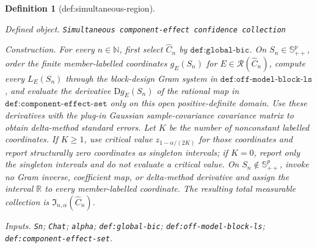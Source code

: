 \documentclass{article}
\newtheorem{definition}{Definition}
\begin{document}
\begin{definition}[def:simultaneous-region]\label{def:simultaneous-region}
\par\smallskip\noindent\emph{Defined object.} \texttt{Simultaneous component-\allowbreak{}effect confidence collection}
\par\smallskip\noindent\emph{Construction.} For every \(n\in\mathbb N\), first select \(\widehat C_n\) by \(\texttt{def:global-bic}\). On \(S_n\in\mathbb S^p_{++}\), order the finite member-labelled coordinates \(g_E(S_n)\) for \(E\in\mathcal R(\widehat C_n)\), compute every \(L_E(S_n)\) through the block-design Gram system in \(\texttt{def:off-model-block-ls}\), and evaluate the derivative \(\mathrm Dg_E(S_n)\) of the rational map in \(\texttt{def:component-effect-set}\) only on this open positive-definite domain. Use these derivatives with the plug-in Gaussian sample-covariance covariance matrix to obtain delta-method standard errors. Let \(K\) be the number of nonconstant labelled coordinates. If \(K\geq1\), use critical value \(z_{1-\alpha/(2K)}\) for those coordinates and report structurally zero coordinates as singleton intervals; if \(K=0\), report only the singleton intervals and do not evaluate a critical value. On \(S_n\notin\mathbb S^p_{++}\), invoke no Gram inverse, coefficient map, or delta-method derivative and assign the interval \(\mathbb R\) to every member-labelled coordinate. The resulting total measurable collection is \(\mathfrak I_{n,\alpha}(\widehat C_n)\).
\par\smallskip\noindent\emph{Inputs.} \texttt{Sn}; \texttt{Chat}; \texttt{alpha}; \texttt{def:\allowbreak{}global-\allowbreak{}bic}; \texttt{def:\allowbreak{}off-\allowbreak{}model-\allowbreak{}block-\allowbreak{}ls}; \texttt{def:\allowbreak{}component-\allowbreak{}effect-\allowbreak{}set}.
\end{definition}
\end{document}

